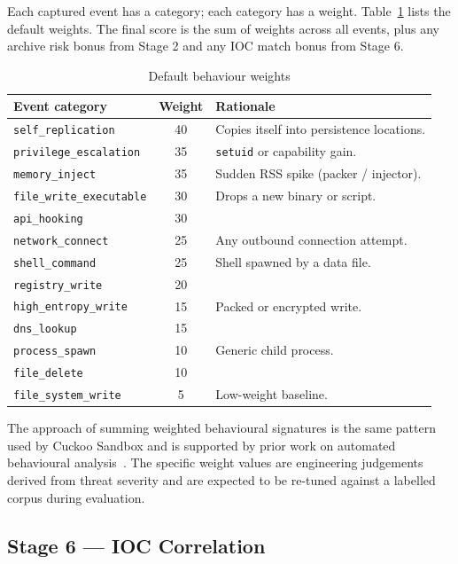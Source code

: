\documentclass[12pt, a4paper]{report}
\begin{document}
Each captured event has a category; each category has a weight.
Table~\ref{tab:sb_weights} lists the default weights. The final score
is the sum of weights across all events, plus any archive risk bonus
from Stage 2 and any IOC match bonus from Stage 6.

\begin{table}[H]
\centering
\caption{Default behaviour weights}
\label{tab:sb_weights}
\begin{tabular}{|l|c|p{6cm}|}
\hline
\textbf{Event category} & \textbf{Weight} & \textbf{Rationale} \\
\hline
\texttt{self\_replication} & 40 & Copies itself into persistence locations. \\
\hline
\texttt{privilege\_escalation} & 35 & \texttt{setuid} or capability gain. \\
\hline
\texttt{memory\_inject} & 35 & Sudden RSS spike (packer / injector). \\
\hline
\texttt{file\_write\_executable} & 30 & Drops a new binary or script. \\
\hline
\texttt{api\_hooking} & 30 & \\
\hline
\texttt{network\_connect} & 25 & Any outbound connection attempt. \\
\hline
\texttt{shell\_command} & 25 & Shell spawned by a data file. \\
\hline
\texttt{registry\_write} & 20 & \\
\hline
\texttt{high\_entropy\_write} & 15 & Packed or encrypted write. \\
\hline
\texttt{dns\_lookup} & 15 & \\
\hline
\texttt{process\_spawn} & 10 & Generic child process. \\
\hline
\texttt{file\_delete} & 10 & \\
\hline
\texttt{file\_system\_write} & 5 & Low-weight baseline. \\
\hline
\end{tabular}
\end{table}

The approach of summing weighted behavioural signatures is the same
pattern used by Cuckoo Sandbox and is supported by prior work on
automated behavioural analysis~\cite{bayer2009scalable}. The specific
weight values are engineering judgements derived from threat severity
and are expected to be re-tuned against a labelled corpus during
evaluation.

\subsection{Stage 6 --- IOC Correlation}
\end{document}
